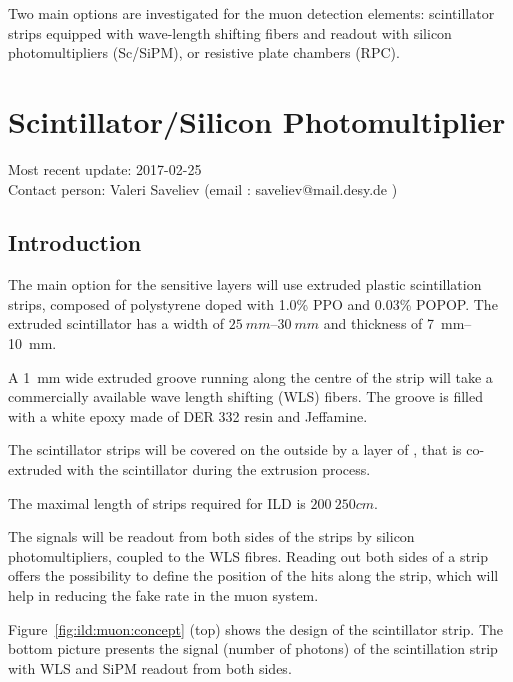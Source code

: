 Two main options are investigated for the muon detection elements: scintillator strips equipped with wave-length shifting fibers and readout with silicon photomultipliers (Sc/SiPM), or resistive plate chambers (RPC).

\section{Scintillator/Silicon Photomultiplier}
Most recent update: 2017-02-25 \\
Contact person: Valeri Saveliev (email : saveliev@mail.desy.de )

\subsection{Introduction}
The main option for the sensitive layers will use extruded plastic scintillation strips, composed of polystyrene doped with 1.0\% PPO and 0.03\% POPOP.
The extruded scintillator has a width of $\SIrange{25}{30}{mm}$ and thickness of \SIrange{7}{10}{mm}.

A \SI{1}{mm} wide extruded groove running along the centre of the strip will take a commercially available wave length shifting (WLS) fibers.
The groove is filled with a white epoxy made of DER 332 resin and Jeffamine.

The scintillator strips will be covered on the outside by a layer of , that is co-extruded with the scintillator during the extrusion process.

The maximal length of strips required for ILD is $\SI{200}{250}{cm}$.

The signals will be readout from both sides of the strips by silicon photomultipliers, coupled to the WLS fibres.
Reading out both sides of a strip offers the possibility to define the position of the hits along the strip, which will help in reducing the fake rate in the muon system.

Figure~\ref{fig:ild:muon:concept} (top) shows the design of the scintillator strip. The bottom picture presents the signal (number of photons) of the scintillation strip with WLS and SiPM readout from both sides.

